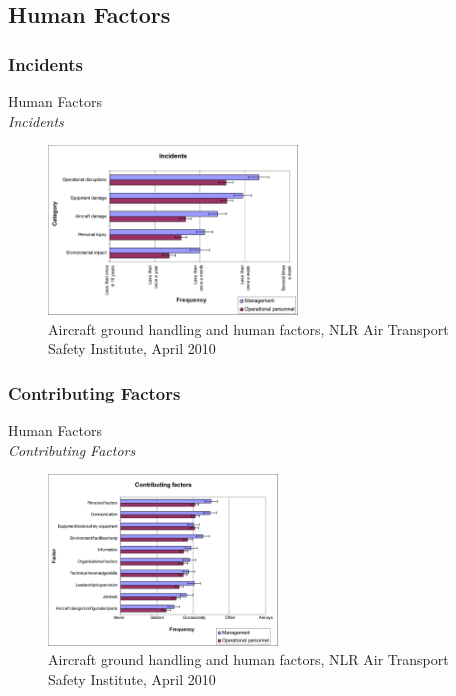 \subsection{Human Factors}

\subsubsection{Incidents}
\begin{frame}{Human Factors\\\textit{Incidents}}{}
	\begin{figure}[H]
	\centering
	\includegraphics[width=250px]{Grafik/FrequencyOfIncidents}
	\caption{\footnotesize Aircraft ground handling and human factors, NLR Air Transport Safety Institute, April 2010}
\end{figure}
\end{frame}

\subsubsection{Contributing Factors}
\begin{frame}{Human Factors\\\textit{Contributing Factors}}{}
	\begin{figure}[H]
	\centering
	\includegraphics[width=230px]{Grafik/ContributingFactors}
	\caption{\footnotesize Aircraft ground handling and human factors, NLR Air Transport Safety Institute, April 2010}
\end{figure}
\end{frame}


